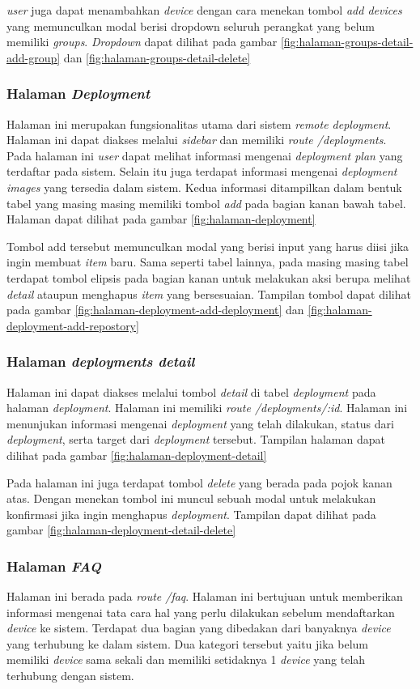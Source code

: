 \textit{user} juga dapat menambahkan \textit{device} dengan cara menekan tombol \textit{add devices} yang memunculkan modal berisi dropdown seluruh perangkat yang belum memiliki \textit{groups}. \textit{Dropdown} dapat dilihat pada gambar \ref{fig:halaman-groups-detail-add-group} dan \ref{fig:halaman-groups-detail-delete}

\subsubsection{Halaman \textit{Deployment}}
Halaman ini merupakan fungsionalitas utama dari sistem \textit{remote deployment}. Halaman ini dapat diakses melalui \textit{sidebar} dan memiliki \textit{route /deployments}. Pada halaman ini \textit{user} dapat melihat informasi mengenai \textit{deployment plan} yang terdaftar pada sistem. Selain itu juga terdapat informasi mengenai \textit{deployment images} yang tersedia dalam sistem. Kedua informasi ditampilkan dalam bentuk tabel yang masing masing memiliki tombol \textit{add} pada bagian kanan bawah tabel. Halaman dapat dilihat pada gambar \ref{fig:halaman-deployment}

Tombol add tersebut memunculkan modal yang berisi input yang harus diisi jika ingin membuat \textit{item} baru. Sama seperti tabel lainnya, pada masing masing tabel terdapat tombol elipsis pada bagian kanan untuk melakukan aksi berupa melihat \textit{detail} ataupun menghapus \textit{item} yang bersesuaian. Tampilan tombol dapat dilihat pada gambar \ref{fig:halaman-deployment-add-deployment} dan \ref{fig:halaman-deployment-add-repostory}

\subsubsection{Halaman \textit{deployments detail}}
Halaman ini dapat diakses melalui tombol \textit{detail} di tabel \textit{deployment} pada halaman \textit{deployment}. Halaman ini memiliki \textit{route /deployments/:id}. Halaman ini menunjukan informasi mengenai \textit{deployment} yang telah dilakukan, status dari \textit{deployment}, serta target dari \textit{deployment} tersebut. Tampilan halaman dapat dilihat pada gambar \ref{fig:halaman-deployment-detail}

Pada halaman ini juga terdapat tombol \textit{delete} yang berada pada pojok kanan atas. Dengan menekan tombol ini muncul sebuah modal untuk melakukan konfirmasi jika ingin menghapus \textit{deployment}. Tampilan dapat dilihat pada gambar \ref{fig:halaman-deployment-detail-delete}

\subsubsection{Halaman \textit{FAQ}}
Halaman ini berada pada \textit{route /faq}. Halaman ini bertujuan untuk memberikan informasi mengenai tata cara hal yang perlu dilakukan sebelum mendaftarkan \textit{device} ke sistem. Terdapat dua bagian yang dibedakan dari banyaknya \textit{device} yang terhubung ke dalam sistem. Dua kategori tersebut yaitu jika belum memiliki \textit{device} sama sekali dan memiliki setidaknya 1 \textit{device} yang telah terhubung dengan sistem.

